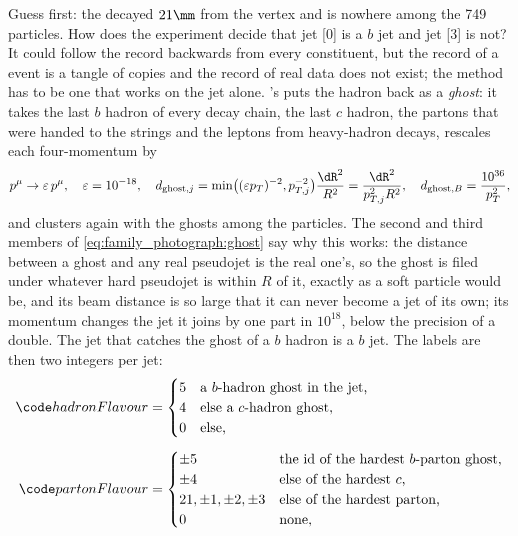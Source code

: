 Guess first: the \Bbar decayed $21\mm$ from the vertex and is nowhere
among the 749 particles. How does the experiment decide that jet [0] is a
$b$ jet and jet [3] is not? It could follow the record backwards from
every constituent, but the record of a \PYTHIA event is a tangle of
copies and the record of real data does not exist; the method has to be
one that works on the jet alone. \CMSSW's 
puts the hadron back as a \emph{ghost}: it takes the last $b$ hadron of
every decay chain, the last $c$ hadron, the partons that were handed to
the strings and the leptons from heavy-hadron decays, rescales each
four-momentum by
\begin{equation}
  p^\mu\to\varepsilon\,p^\mu,\quad\varepsilon=10^{-18},\quad
  d_{\mathrm{ghost},j}=\min\!\big((\varepsilon p_T)^{-2},p_{T,j}^{-2}\big)\frac{\dR^2}{R^2}=\frac{\dR^2}{p_{T,j}^{2}R^2},\quad
  d_{\mathrm{ghost},B}=\frac{10^{36}}{p_T^2},
  \label{eq:family_photograph:ghost}
\end{equation}
and clusters again with the ghosts among the particles. The second and
third members of \cref{eq:family_photograph:ghost} say why this works: the
distance between a ghost and any real pseudojet is the real one's, so the
ghost is filed under whatever hard pseudojet is within $R$ of it, exactly
as a soft particle would be, and its beam distance is so large that it
can never become a jet of its own; its momentum changes the jet it joins
by one part in $10^{18}$, below the precision of a double. The jet that
catches the ghost of a $b$ hadron is a $b$ jet. The labels are then two
integers per jet:
\begin{equation}
\begin{aligned}
  \hadflav&=\begin{cases}5 & \text{a $b$-hadron ghost in the jet,}\\ 4 & \text{else a $c$-hadron ghost,}\\ 0 & \text{else,}\end{cases}\\[4pt]
  \partflav&=\begin{cases}\pm5 & \text{the id of the hardest $b$-parton ghost,}\\ \pm4 & \text{else of the hardest $c$,}\\ 21,\pm1,\pm2,\pm3 & \text{else of the hardest parton,}\\ 0 & \text{none,}\end{cases}
\end{aligned}
  \label{eq:family_photograph:labels}
\end{equation}

